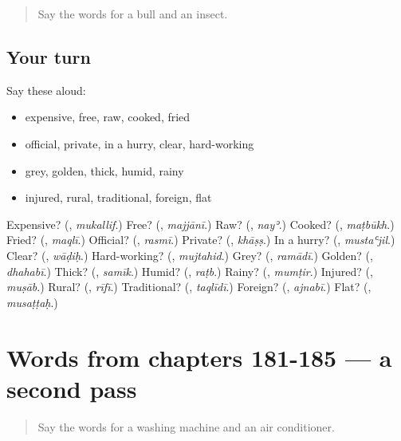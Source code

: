 \begin{quote}
Say the words for a bull and an insect.
\end{quote}

\subsection*{Your turn}
Say these aloud:

\begin{itemize}
\raggedright
  \item expensive, free, raw, cooked, fried
  \item official, private, in a hurry, clear, hard-working
  \item grey, golden, thick, humid, rainy
  \item injured, rural, traditional, foreign, flat
\end{itemize}

\begin{tcolorbox}[breakable,colback=teal!4,colframe=teal!35!black,title={Before you move on}]
Expensive? (\textbf{}, \emph{mukallif}.) Free? (\textbf{}, \emph{majjānī}.) Raw? (\textbf{}, \emph{nayʾ}.) Cooked? (\textbf{}, \emph{maṭbūkh}.) Fried? (\textbf{}, \emph{maqlī}.) Official? (\textbf{}, \emph{rasmī}.) Private? (\textbf{}, \emph{khāṣṣ}.) In a hurry? (\textbf{}, \emph{mustaʿjil}.) Clear? (\textbf{}, \emph{wāḍiḥ}.) Hard-working? (\textbf{}, \emph{mujtahid}.) Grey? (\textbf{}, \emph{ramādī}.) Golden? (\textbf{}, \emph{dhahabī}.) Thick? (\textbf{}, \emph{samīk}.) Humid? (\textbf{}, \emph{raṭb}.) Rainy? (\textbf{}, \emph{mumṭir}.) Injured? (\textbf{}, \emph{muṣāb}.) Rural? (\textbf{}, \emph{rīfī}.) Traditional? (\textbf{}, \emph{taqlīdī}.) Foreign? (\textbf{}, \emph{ajnabī}.) Flat? (\textbf{}, \emph{musaṭṭaḥ}.)
\end{tcolorbox}
\section[(dialogue)]{Words from chapters 181-185 — a second pass}

\label{lesson:AR-R185-second-pass-words-from-chapters-181-185}



\begin{quote}
Say the words for a washing machine and an air conditioner.
\end{quote}

